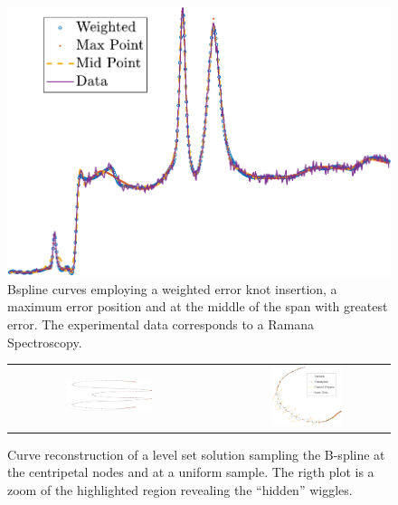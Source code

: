  \begin{figure}
 \centering
  \includegraphics[width = \textwidth]{knot_placement_plot}
  \caption{\label{fig:knot_placement} Bspline curves employing a weighted error knot insertion, a maximum error position and at the middle of the span with greatest error. 
  The experimental data corresponds to a Ramana Spectroscopy.}
 \end{figure}

 
 \begin{figure}
  \centering
  \begin{tabular}{ccc}
  \includegraphics[width=0.45\textwidth,height= 0.3\textwidth]{ellipse-crop}&&
  \includegraphics[width=0.45\textwidth,height= 0.3\textwidth]{wiggle_ALL-crop}
  \end{tabular}
\caption{\label{fig:bspline_wiggle}Curve reconstruction of a level set solution sampling the B-spline at 
the centripetal nodes and at a uniform sample. The rigth plot is a zoom of the highlighted region revealing the ``hidden'' wiggles.}
 \end{figure}


